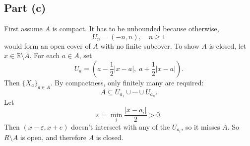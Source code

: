 \documentclass{article}
\newcommand{\R}{\mathbb{R}}
\newcommand{\eps}{\varepsilon}
\begin{document}
\subsection*{Part (c)}
First assume $A$ is compact. It has to be unbounded because otherwise,
$$U_n = (-n, n), \quad n \ge 1$$
would form an open cover of $A$ with no finite subcover. To show $A$ is closed, let $x \in \R \setminus A$. For each $a \in A$, set
$$U_a = \left(a - \frac{1}{2}|x - a|,\; a + \frac{1}{2}|x - a|\right).$$
Then $\{X_a\}_{a \in A}$. By compactness, only finitely many are required:
$$A \subseteq U_{a_1} \cup \cdots \cup U_{a_n}.$$
Let
$$\eps = \min_i \frac{|x - a_i|}{2} > 0.$$
Then $(x - \eps, x + e)$ doesn't intersect with any of the $U_{a_i}$, so it misses $A$. So $R \setminus A$ is open, and therefore $A$ is closed.
\end{document}
